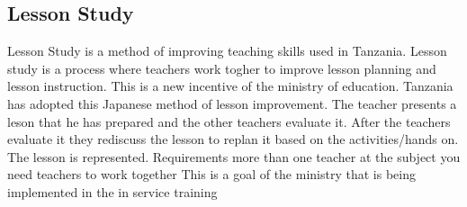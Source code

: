 \subsection{Lesson Study}
Lesson Study is a method of improving teaching skills used in Tanzania. Lesson study is a process where teachers work togher to improve lesson planning and lesson instruction. 
This is a new incentive of the ministry of education. 
Tanzania has adopted this Japanese method of lesson improvement. The teacher presents a leson that he has prepared and the other teachers evaluate it. After the teachers evaluate it they rediscuss the lesson to replan it based on the activities/hands on. The lesson is represented.
Requirements
more than one teacher at the subject
you need teachers to work together
This is a goal of the ministry that is being implemented in the in service training

